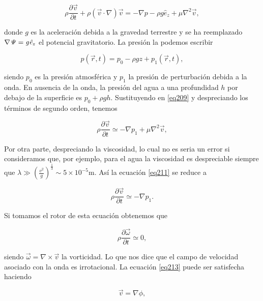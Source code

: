 \begin{equation}\label{eq209}
   \rho \frac{\partial \vec{v}}{\partial t} + \rho (\vec{v} \cdot \nabla ) \vec{v} = - \nabla p - \rho g  \hat{e}_{z} + \mu  \nabla^2 \vec{v},
\end{equation}

\noindent donde $g$ es la aceleración debida a la gravedad terrestre y se ha reemplazado $\nabla \it\Psi = g \hat{e}_{z}$ el potencial gravitatorio. La presión la podemos escribir

\begin{equation}\label{eq210}
   p(\vec{r}, t) = p_0 - \rho gz + p_1(\vec{r}, t),
\end{equation}

\noindent siendo $p_0$ es la presión atmosférica y $p_1$ la presión de perturbación debida a la onda. En ausencia de la onda, la presión del agua a una profundidad $h$ por debajo de la superficie es $p_0+\rho g h$. Sustituyendo en \ref{eq209} y despreciando los términos de segundo orden, tenemos

\begin{equation}\label{eq211}
   \rho \frac{\partial \vec{v}}{\partial t} \simeq - \nabla p_1 + \mu  \nabla^2 \vec{v},
\end{equation}

Por otra parte, despreciando la viscosidad, lo cual no es seria un error si consideramos que, por ejemplo, para el agua la viscosidad es despreciable siempre que $\lambda \gg (\tfrac{v^2}{g})^{\tfrac{1}{3}} \sim 5 \times 10^{-5}$m. Así la ecuación \ref{eq211} se reduce a

\begin{equation}\label{eq212}
   \rho \frac{\partial \vec{v}}{\partial t} \simeq - \nabla p_1.
\end{equation}

Si tomamos el rotor de esta ecuación obtenemos que 

\begin{equation}\label{eq213}
   \rho \frac{\partial \vec{\omega}}{\partial t} \simeq 0,
\end{equation}

\noindent siendo $\vec{\omega} = \nabla \times \vec{v}$ la vorticidad. Lo que nos dice que el campo de velocidad asociado con la onda es irrotacional. La ecuación \ref{eq213} puede ser satisfecha haciendo 

\begin{equation}\label{eq214}
   \vec{v} = \nabla \phi,
\end{equation}


